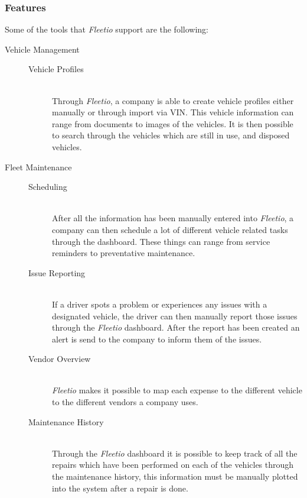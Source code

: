 \subsubsection{Features}\label{ssub:features}
Some of the tools that \textit{Fleetio} support are the following:
\begin{description}
    \item[Vehicle Management] \hfill
    \begin{description}
        \item[Vehicle Profiles] \hfill \\
        Through \textit{Fleetio}, a company is able to create vehicle profiles either manually or through import via \ac{VIN}. This vehicle information can range from documents to images of the vehicles.
        It is then possible to search through the vehicles which are still in use, and disposed vehicles.
    \end{description}

    \item[Fleet Maintenance] \hfill
    \begin{description}
        \item[Scheduling] \hfill \\
        After all the information has been manually entered into \textit{Fleetio}, a company can then schedule a lot of different vehicle related tasks through the dashboard.
        These things can range from service reminders to preventative maintenance.
        \item[Issue Reporting] \hfill \\
        If a driver spots a problem or experiences any issues with a designated vehicle, the driver can then manually report those issues through the \textit{Fleetio} dashboard.
        After the report has been created an alert is send to the company to inform them of the issues.
        \item[Vendor Overview] \hfill \\
        \textit{Fleetio} makes it possible to map each expense to the different vehicle to the different vendors a company uses.
        \item[Maintenance History] \hfill \\
        Through the \textit{Fleetio} dashboard it is possible to keep track of all the repairs which have been performed on each of the vehicles through the maintenance history, this information must be manually plotted into the system after a repair is done.
    \end{description}


\end{description}
